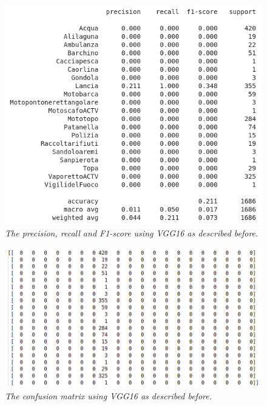 \documentclass[12pt,a4paper]{report}
\begin{document}
\begin{figure}[H]
\centering
\includegraphics[scale=0.4]{./immagini/vgg16/0_data_augmentation_-_3_patience_stopping_-_no_dropout_-_no_batch_norm/f1.png}
\caption{\textit{The precision, recall and F1-score using VGG16 as described before.}}
\end{figure}
\begin{figure}[H]
\centering
\includegraphics[scale=0.4]{./immagini/vgg16/0_data_augmentation_-_3_patience_stopping_-_no_dropout_-_no_batch_norm/cm_num.png}
\caption{\textit{The confusion matrix using VGG16 as described before.}}
\end{figure}
\end{document}
